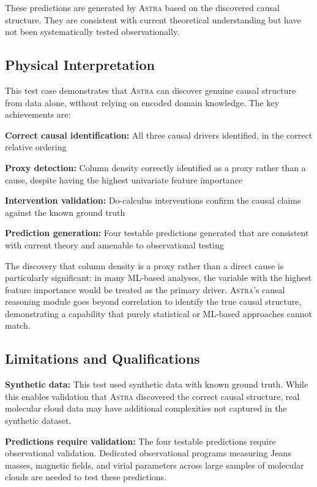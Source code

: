 \documentclass[usenatbib]{rasti}
\newcommand{\astra}{\textsc{Astra}\xspace}
\begin{document}
These predictions are generated by \astra based on the discovered causal structure. They are consistent with current theoretical understanding but have not been systematically tested observationally.

\subsection{Physical Interpretation}
\label{sec:tc6:interpretation}

This test case demonstrates that \astra can discover genuine causal structure from data alone, without relying on encoded domain knowledge.
The key achievements are:
\begin{description}
  \item \textbf{Correct causal identification:} All three causal drivers identified, in the correct relative ordering
  \item \textbf{Proxy detection:} Column density correctly identified as a proxy rather than a cause, despite having the highest univariate feature importance
  \item \textbf{Intervention validation:} Do-calculus interventions confirm the causal claims against the known ground truth
  \item \textbf{Prediction generation:} Four testable predictions generated that are consistent with current theory and amenable to observational testing
\end{description}

The discovery that column density is a proxy rather than a direct cause is particularly significant: in many ML-based analyses, the variable with the highest feature importance would be treated as the primary driver.
\astra's causal reasoning module goes beyond correlation to identify the true causal structure, demonstrating a capability that purely statistical or ML-based approaches cannot match.

\subsection{Limitations and Qualifications}
\label{sec:tc6:limitations}

\textbf{Synthetic data:}
This test used synthetic data with known ground truth.
While this enables validation that \astra discovered the correct causal structure, real molecular cloud data may have additional complexities not captured in the synthetic dataset.

\textbf{Predictions require validation:}
The four testable predictions require observational validation.
Dedicated observational programs measuring Jeans masses, magnetic fields, and virial parameters across large samples of molecular clouds are needed to test these predictions.
\end{document}
